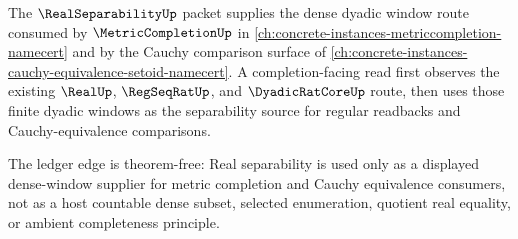 The $\RealSeparabilityUp$ packet supplies the dense dyadic window route consumed by $\MetricCompletionUp$ in \autoref{ch:concrete-instances-metriccompletion-namecert} and by the Cauchy comparison surface of \autoref{ch:concrete-instances-cauchy-equivalence-setoid-namecert}. A completion-facing read first observes the existing $\RealUp$, $\RegSeqRatUp$, and $\DyadicRatCoreUp$ route, then uses those finite dyadic windows as the separability source for regular readbacks and Cauchy-equivalence comparisons.

The ledger edge is theorem-free: Real separability is used only as a displayed dense-window supplier for metric completion and Cauchy equivalence consumers, not as a host countable dense subset, selected enumeration, quotient real equality, or ambient completeness principle.
